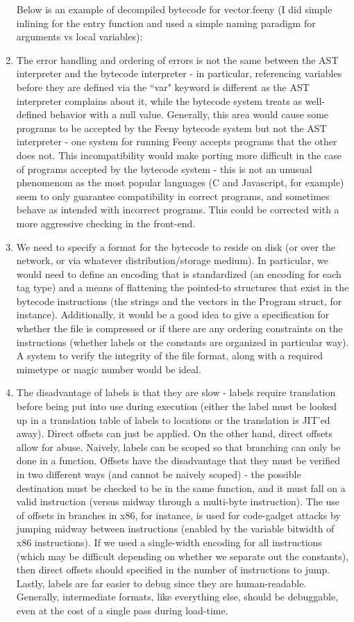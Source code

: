 \documentclass[notitlepage]{report}
\begin{document}
\begin{enumerate}
		Below is an example of decompiled bytecode for vector.feeny (I did simple inlining for the entry function and used a simple naming paradigm for arguments vs local variables):
		
	\item %
		The error handling and ordering of errors is not the same between the AST interpreter and the bytecode interpreter - in particular, referencing variables before they are defined via the ``var" keyword is different as the AST interpreter complains about it, while the bytecode system treats as well-defined behavior with a null value.  Generally, this area would cause some programs to be accepted by the Feeny bytecode system but not the AST interpreter - one system for running Feeny accepts programs that the other does not.  This incompatibility would make porting more difficult in the case of programs accepted by the bytecode system - this is not an unusual phenomenom as the most popular languages (C and Javascript, for example) seem to only guarantee compatibility in correct programs, and sometimes behave as intended with incorrect programs.  This could be corrected with a more aggressive checking in the front-end.
	\item We need to specify a format for the bytecode to reside on disk (or over the network, or via whatever distribution/storage medium).  In particular, we would need to define an encoding that is standardized (an encoding for each tag type) and a means of flattening the pointed-to structures that exist in the bytecode instructions (the strings and the vectors in the Program struct, for instance).  Additionally, it would be a good idea to give a specification for whether the file is compressed or if there are any ordering constraints on the instructions (whether labels or the constants are organized in particular way).  A system to verify the integrity of the file format, along with a required mimetype or magic number would be ideal.
	\item The disadvantage of labels is that they are slow - labels require translation before being put into use during execution (either the label must be looked up in a translation table of labels to locations or the translation is JIT'ed away).  Direct offsets can just be applied.  On the other hand, direct offsets allow for abuse.  Naively, labels can be scoped so that branching can only be done in a function.  Offsets have the disadvantage that they must be verified in two different ways (and cannot be naively scoped) - the possible destination must be checked to be in the same function, and it must fall on a valid instruction (versus midway through a multi-byte instruction).  The use of offsets in branches in x86, for instance, is used for code-gadget attacks by jumping midway between instructions (enabled by the variable bitwidth of x86 instructions).  If we used a single-width encoding for all instructions (which may be difficult depending on whether we separate out the constants), then direct offsets should specified in the number of instructions to jump.\\

		Lastly, labels are far easier to debug since they are human-readable.  Generally, intermediate formats, like everything else, should be debuggable, even at the cost of a single pass during load-time.
\end{enumerate}
\end{document}
